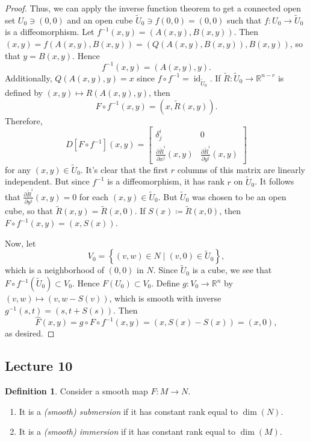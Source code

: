 \documentclass[10pt,letterpaper,cm]{nupset}
\theoremstyle{definition}
\newtheorem{definition}{Definition}[subsection]
\theoremstyle{theorem}
\theoremstyle{remark}
\newcommand{\R}{\mathbb R}
\newcommand{\1}{\mathbf{1}}
\newcommand{\0}{\vec 0}
\DeclareMathOperator{\id}{id}
\begin{document}
\begin{proof}
 Thus, we can apply the inverse function theorem to get a connected open set $U_0 \ni \left(0,0\right)$ and an open cube $\widetilde{U}_0 \ni f\left(0,0\right) = \left(0,0\right)$ such that $f: U_0 \to \widetilde{U}_0$ is a diffeomorphism.  Let $f^{-1}(x,y) =\left(A(x,y), B(x,y)\right)$. Then $\left(x,y\right) = f(A(x,y), B(x,y)) = \left(Q(A(x,y), B(x,y)), B(x,y)\right)$, so that $y = B(x,y)$. Hence $$f^{-1}(x,y) = \left(A(x,y), y\right).$$ Additionally, $Q(A(x,y), y)=x$ since $f\circ f^{-1} = \id_{\widetilde{U}_0}$. If $\widetilde{R} : \widetilde{U}_0 \to \R^{n-r}$ is defined by $\left(x,y\right) \mapsto R(A(x,y), y)$, then $$F\circ f^{-1}(x,y) = \left(x, \widetilde{R}(x,y)\right).$$ Therefore, $$D[F\circ f^{-1}](x,y)  =  \begin{bmatrix}    \delta^i_j & 0 \\ 
\frac{\partial{\widetilde{R}^i}}{\partial{x^j}}(x,y) & \frac{\partial{\widetilde{R}^i}}{\partial{y^j}}(x,y)    \end{bmatrix} $$ for any $\left(x,y\right) \in \widetilde{U}_0$. It's clear that the first $r$ columns of this matrix are linearly independent. But since $f^{-1}$ is a diffeomorphism, it has rank $r$ on $\widetilde{U}_0$. It follows that $ \frac{\partial{\widetilde{R}^i}}{\partial{y^j}}(x,y) =0$ for each $\left(x,y\right) \in \widetilde{U}_0$. But $\widetilde{U}_0$ was chosen to be an open cube, so that $\widetilde{R}(x,y) = \widetilde{R}(x,0)$. If $S(x) \coloneqq \widetilde{R}(x,0)$, then $F \circ f^{-1}(x,y) = (x, S(x))$. 

\medskip

 Now, let $$V_0 = \left\{(v,w) \in N \mid (v,0)\in \widetilde{U}_0\right\},$$ which is a neighborhood of $\left(0,0\right)$ in  $N$. Since $\widetilde{U}_0$ is a cube, we see that $F \circ f^{-1}(\widetilde{U}_0) \subset V_0$. Hence $F(U_0) \subset V_0$.  Define $g : V_0 \to \R^n$ by $\left(v,w\right) \mapsto (v, w-S(v))$, which is smooth with inverse $g^{-1}(s,t) = \left(s, t + S(s)\right)$. Then $$\widehat{F}(x,y) = g \circ F \circ f^{-1}(x,y) = (x, S(x) - S(x)) = (x,0),$$ as desired.
\end{proof}

\subsection{Lecture 10}

\begin{definition} 
Consider a smooth map $F: M \to N$. 
\begin{enumerate}
\item It is a \textit{(smooth) submersion} if it has constant rank equal to $\dim(N)$. 
\item It is a \textit{(smooth) immersion} if it has constant rank equal to $\dim(M)$.
\end{enumerate}
\end{definition}
\end{document}
